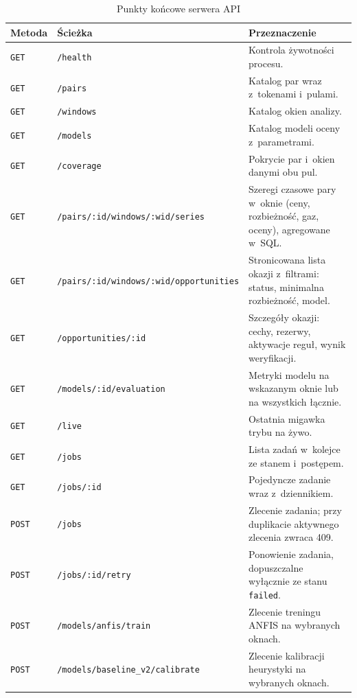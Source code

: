 \begin{table}[H]\centering\small
\caption{Punkty końcowe serwera API}\label{tab:api}
\begin{tabular}{llp{7.4cm}}
\toprule
Metoda & Ścieżka & Przeznaczenie \\
\midrule
\texttt{GET}  & \texttt{/health} & Kontrola żywotności procesu. \\
\texttt{GET}  & \texttt{/pairs} & Katalog par wraz z~tokenami i~pulami. \\
\texttt{GET}  & \texttt{/windows} & Katalog okien analizy. \\
\texttt{GET}  & \texttt{/models} & Katalog modeli oceny z~parametrami. \\
\texttt{GET}  & \texttt{/coverage} & Pokrycie par i~okien danymi obu pul. \\
\texttt{GET}  & \texttt{/pairs/:id/windows/:wid/series} & Szeregi czasowe pary w~oknie (ceny, rozbieżność, gaz, oceny), agregowane w~SQL. \\
\texttt{GET}  & \texttt{/pairs/:id/windows/:wid/opportunities} & Stronicowana lista okazji z~filtrami: status, minimalna rozbieżność, model. \\
\texttt{GET}  & \texttt{/opportunities/:id} & Szczegóły okazji: cechy, rezerwy, aktywacje reguł, wynik weryfikacji. \\
\texttt{GET}  & \texttt{/models/:id/evaluation} & Metryki modelu na wskazanym oknie lub na wszystkich łącznie. \\
\texttt{GET}  & \texttt{/live} & Ostatnia migawka trybu na żywo. \\
\texttt{GET}  & \texttt{/jobs} & Lista zadań w~kolejce ze stanem i~postępem. \\
\texttt{GET}  & \texttt{/jobs/:id} & Pojedyncze zadanie wraz z~dziennikiem. \\
\texttt{POST} & \texttt{/jobs} & Zlecenie zadania; przy duplikacie aktywnego zlecenia zwraca 409. \\
\texttt{POST} & \texttt{/jobs/:id/retry} & Ponowienie zadania, dopuszczalne wyłącznie ze stanu \texttt{failed}. \\
\texttt{POST} & \texttt{/models/anfis/train} & Zlecenie treningu ANFIS na wybranych oknach. \\
\texttt{POST} & \texttt{/models/baseline\_v2/calibrate} & Zlecenie kalibracji heurystyki na wybranych oknach. \\
\bottomrule
\end{tabular}
\end{table}

